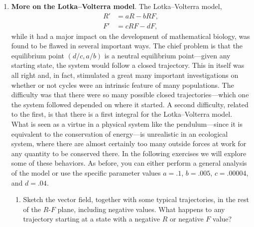 \begin{enumerate}
\begin{enumerate}
  \item An often-articulated concept in ecology is the {\em principle of
  competitive exclusion},
which states that you can't have a stable situation in which two
species compete for the same resource---one of them will eventually
crowd out the other.  Is the model you've been exploring in this
problem consistent with such a principle?

\enlargethispage*{10pt}

\end{enumerate}
\item {\bf More on the Lotka--Volterra model}.  The Lotka--Volterra model,
\begin{align*}
R' &= aR-bRF, \\
F' &= cRF-dF,
\end{align*}
while it had a major impact on the development of mathematical
biology, was found to be flawed in several important ways.  The chief
problem is that the equilibrium point $(d/c, a/b)$ is a neutral
equilibrium point---given any starting state, the system would follow
a closed trajectory.  This in itself was all right and, in fact,
stimulated a great many important investigations on whether or not
cycles were an intrinsic feature of many populations.  The difficulty
was that there were so many possible closed trajectories---which one
the system followed depended on where it started.  A second
difficulty, related to the first, is that there is a first integral
for the Lotka--Volterra model.  What is seen as a virtue in a physical
system like the pendulum---since it is equivalent to the conservation
of energy---is unrealistic in an ecological system, where there are
almost certainly too many outside forces at work for any quantity to
be conserved there.  In the following exercises we will explore some
of these behaviors.  As before, you can either perform a general
analysis of the model or use the specific parameter values $a=.1$,
$b=.005$, $c=.00004$, and $d=.04$.

  \begin{enumerate}
  \item Sketch the vector field, together with some typical trajectories,
in the rest of the $R$-$F$ plane, including negative values. What
happens to any trajectory starting at a state with a negative $R$ or
negative $F$ value?


\end{enumerate}
\end{enumerate}
